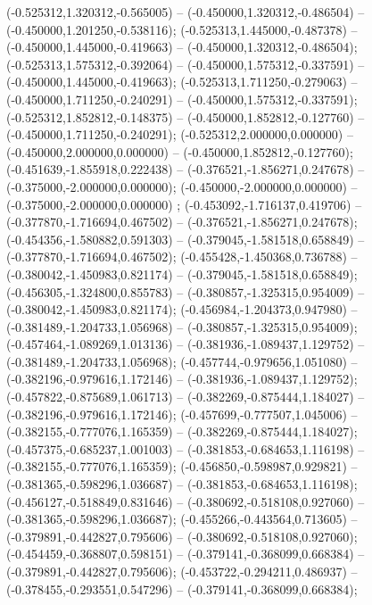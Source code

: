  (-0.525312,1.320312,-0.565005) -- (-0.450000,1.320312,-0.486504) -- (-0.450000,1.201250,-0.538116);
 (-0.525313,1.445000,-0.487378) -- (-0.450000,1.445000,-0.419663) -- (-0.450000,1.320312,-0.486504);
 (-0.525313,1.575312,-0.392064) -- (-0.450000,1.575312,-0.337591) -- (-0.450000,1.445000,-0.419663);
 (-0.525313,1.711250,-0.279063) -- (-0.450000,1.711250,-0.240291) -- (-0.450000,1.575312,-0.337591);
 (-0.525312,1.852812,-0.148375) -- (-0.450000,1.852812,-0.127760) -- (-0.450000,1.711250,-0.240291);
 (-0.525312,2.000000,0.000000) -- (-0.450000,2.000000,0.000000) -- (-0.450000,1.852812,-0.127760);
 (-0.451639,-1.855918,0.222438) -- (-0.376521,-1.856271,0.247678) -- (-0.375000,-2.000000,0.000000);
 (-0.450000,-2.000000,0.000000) -- (-0.375000,-2.000000,0.000000) ;
 (-0.453092,-1.716137,0.419706) -- (-0.377870,-1.716694,0.467502) -- (-0.376521,-1.856271,0.247678);
 (-0.454356,-1.580882,0.591303) -- (-0.379045,-1.581518,0.658849) -- (-0.377870,-1.716694,0.467502);
 (-0.455428,-1.450368,0.736788) -- (-0.380042,-1.450983,0.821174) -- (-0.379045,-1.581518,0.658849);
 (-0.456305,-1.324800,0.855783) -- (-0.380857,-1.325315,0.954009) -- (-0.380042,-1.450983,0.821174);
 (-0.456984,-1.204373,0.947980) -- (-0.381489,-1.204733,1.056968) -- (-0.380857,-1.325315,0.954009);
 (-0.457464,-1.089269,1.013136) -- (-0.381936,-1.089437,1.129752) -- (-0.381489,-1.204733,1.056968);
 (-0.457744,-0.979656,1.051080) -- (-0.382196,-0.979616,1.172146) -- (-0.381936,-1.089437,1.129752);
 (-0.457822,-0.875689,1.061713) -- (-0.382269,-0.875444,1.184027) -- (-0.382196,-0.979616,1.172146);
 (-0.457699,-0.777507,1.045006) -- (-0.382155,-0.777076,1.165359) -- (-0.382269,-0.875444,1.184027);
 (-0.457375,-0.685237,1.001003) -- (-0.381853,-0.684653,1.116198) -- (-0.382155,-0.777076,1.165359);
 (-0.456850,-0.598987,0.929821) -- (-0.381365,-0.598296,1.036687) -- (-0.381853,-0.684653,1.116198);
 (-0.456127,-0.518849,0.831646) -- (-0.380692,-0.518108,0.927060) -- (-0.381365,-0.598296,1.036687);
 (-0.455266,-0.443564,0.713605) -- (-0.379891,-0.442827,0.795606) -- (-0.380692,-0.518108,0.927060);
 (-0.454459,-0.368807,0.598151) -- (-0.379141,-0.368099,0.668384) -- (-0.379891,-0.442827,0.795606);
 (-0.453722,-0.294211,0.486937) -- (-0.378455,-0.293551,0.547296) -- (-0.379141,-0.368099,0.668384);
